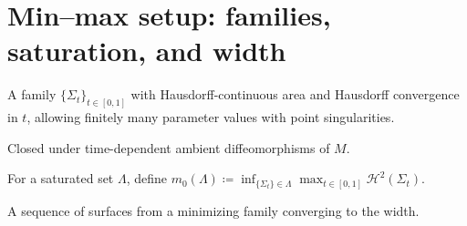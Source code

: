 \chapter{Min--max setup: families, saturation, and width}

\begin{definition}\label{def:gen-family}
\leanok
A family $\{\Sigma_t\}_{t\in[0,1]}$ with Hausdorff-continuous area and Hausdorff convergence in $t$, allowing finitely many parameter values with point singularities.
\uses{}
\end{definition}

\begin{definition}\label{def:saturated}
\leanok
Closed under time-dependent ambient diffeomorphisms of $M$.
\uses{}
\end{definition}

\begin{definition}[Width]\label{def:m0}
\leanok
For a saturated set $\Lambda$, define
$m_0(\Lambda) \coloneqq \inf_{\{\Sigma_t\}\in \Lambda} \max_{t\in[0,1]} \mathcal H^2(\Sigma_t)$.
\end{definition}

\begin{definition}\label{def:minmax-sequence}
\leanok
A sequence of surfaces from a minimizing family converging to the width.
\end{definition}
